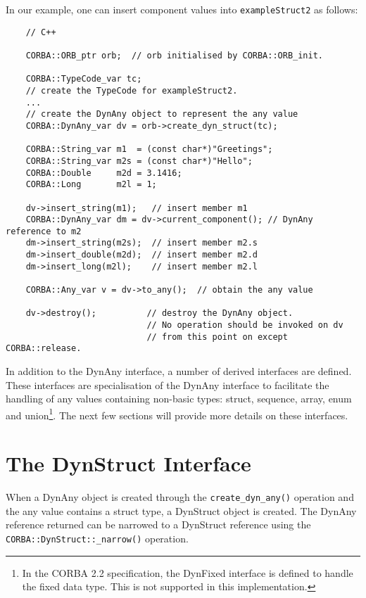 \documentclass[11pt,twoside,onecolumn]{book}
\begin{document}
In our example, one can insert component values into {\tt exampleStruct2} as
follows:

{\small
\begin{verbatim}
    // C++
    
    CORBA::ORB_ptr orb;  // orb initialised by CORBA::ORB_init.
    
    CORBA::TypeCode_var tc;
    // create the TypeCode for exampleStruct2.
    ...
    // create the DynAny object to represent the any value
    CORBA::DynAny_var dv = orb->create_dyn_struct(tc);
    
    CORBA::String_var m1  = (const char*)"Greetings";
    CORBA::String_var m2s = (const char*)"Hello";
    CORBA::Double     m2d = 3.1416;
    CORBA::Long       m2l = 1;
    
    dv->insert_string(m1);   // insert member m1
    CORBA::DynAny_var dm = dv->current_component(); // DynAny reference to m2
    dm->insert_string(m2s);  // insert member m2.s
    dm->insert_double(m2d);  // insert member m2.d
    dm->insert_long(m2l);    // insert member m2.l
    
    CORBA::Any_var v = dv->to_any();  // obtain the any value
    
    dv->destroy();          // destroy the DynAny object.
                            // No operation should be invoked on dv
                            // from this point on except CORBA::release.
\end{verbatim}
}


In addition to the DynAny interface, a number of derived interfaces are
defined. These interfaces are specialisation of the DynAny interface to
facilitate the handling of any values containing non-basic types: struct,
sequence, array, enum and union\footnote{In the CORBA 2.2 specification, the
DynFixed interface is defined to handle the fixed data type. This is not
supported in this implementation.}. The next few sections will provide more
details on these interfaces.

\section{The DynStruct Interface}

When a DynAny object is created through the {\tt create\_dyn\_any()}
operation and the any value contains a struct type, a DynStruct object is
created. The DynAny reference returned can be narrowed to a DynStruct
reference using the {\tt CORBA::DynStruct::\_narrow()} operation.
\end{document}
